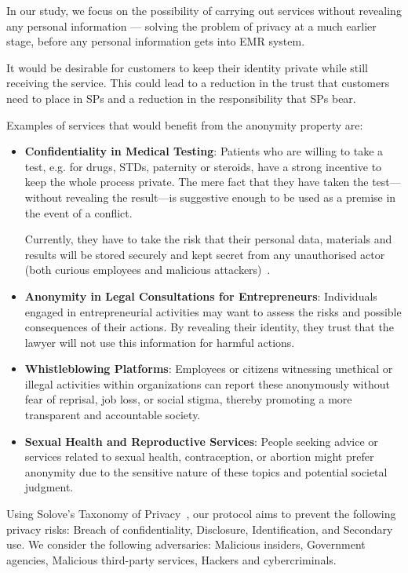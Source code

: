 \documentclass[pdftex,twocolumn,epjc3]{svjour3}
\begin{document}
In our study, we focus on the possibility of carrying out services without revealing any personal information — solving the problem of privacy at a much earlier stage, before any personal information gets into EMR system.

It would be desirable for customers to keep their identity private while still receiving the service. This could lead to a reduction in the trust that customers need to place in SPs and a reduction in the responsibility that SPs bear.

Examples of services that would benefit from the anonymity property are:
\begin{itemize}
    \item \textbf{Confidentiality in Medical Testing}: Patients who are willing to take a test, e.g. for drugs, STDs, paternity or steroids, have a strong incentive to keep the whole process private. The mere fact that they have taken the test—without revealing the result—is suggestive enough to be used as a premise in the event of a conflict.

    Currently, they have to take the risk that their personal data, materials and results will be stored securely and kept secret from any unauthorised actor (both curious employees and malicious attackers)~\cite{klitzmanExclusionGeneticInformation2010, blackPresymptomaticTestingConfidentiality2021}.


\item \textbf{Anonymity in Legal Consultations for Entrepreneurs}: Individuals engaged in entrepreneurial activities may want to assess the risks and possible consequences of their actions. By revealing their identity, they trust that the lawyer will not use this information for harmful actions.
\item \textbf{Whistleblowing Platforms}: Employees or citizens witnessing unethical or illegal activities within organizations can report these anonymously without fear of reprisal, job loss, or social stigma, thereby promoting a more transparent and accountable society.
\item \textbf{Sexual Health and Reproductive Services}: People seeking advice or services related to sexual health, contraception, or abortion might prefer anonymity due to the sensitive nature of these topics and potential societal judgment.
\end{itemize}

Using Solove's Taxonomy of Privacy~\cite{soloveTaxonomyPrivacy2006}, our protocol aims to prevent the following privacy risks: Breach of confidentiality, Disclosure, Identification, and Secondary use. We consider the following adversaries: Malicious insiders, Government agencies, Malicious third-party services, Hackers and cybercriminals.
\end{document}
